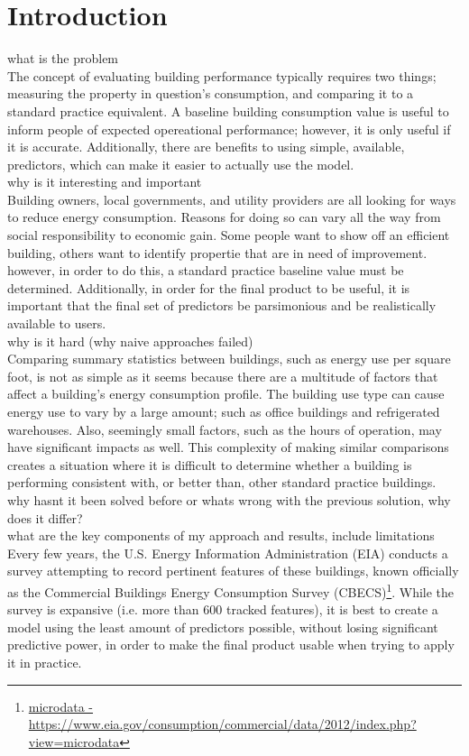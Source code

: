 {\section*{Introduction}}
\noindent
what is the problem\\
The concept of evaluating building performance typically requires two things; measuring the property in question's consumption, and comparing it to a standard practice equivalent.  A baseline building consumption value is useful to inform people of expected opereational performance; however, it is only useful if it is accurate.  Additionally, there are benefits to using simple, available, predictors, which can make it easier to actually use the model.\\

why is it interesting and important\\
Building owners, local governments, and utility providers are all looking for ways to reduce energy consumption.  Reasons for doing so can vary all the way from social responsibility to economic gain.  Some people want to show off an efficient building, others want to identify propertie that are in need of improvement.  however, in order to do this, a standard practice baseline value must be determined.  Additionally, in order for the final product to be useful, it is important that the final set of predictors be parsimonious and be realistically available to users.\\

why is it hard (why naive approaches failed)\\
Comparing summary statistics between buildings, such as energy use per square foot, is not as simple as it seems because there are a multitude of factors that affect a building’s energy consumption profile.  The building use type can cause energy use to vary by a large amount; such as office buildings and refrigerated warehouses.  Also, seemingly small factors, such as the hours of operation, may have significant impacts as well.  This complexity of making similar comparisons creates a situation where it is difficult to determine whether a building is performing consistent with, or better than, other standard practice buildings.\\

why hasnt it been solved before or whats wrong with the previous solution, why does it differ?\\


what are the key components of my approach and results, include limitations\\
Every few years, the U.S. Energy Information Administration (EIA) conducts a survey attempting to record pertinent features of these buildings, known officially as the Commercial Buildings Energy Consumption Survey (CBECS)\footnote{\href{https://www.eia.gov/consumption/commercial/data/2012/index.php?view=microdata}{microdata - \url{https://www.eia.gov/consumption/commercial/data/2012/index.php?view=microdata}}}.  While the survey is expansive (i.e. more than 600 tracked features), it is best to create a model using the least amount of predictors possible, without losing significant predictive power, in order to make the final product usable when trying to apply it in practice.\\